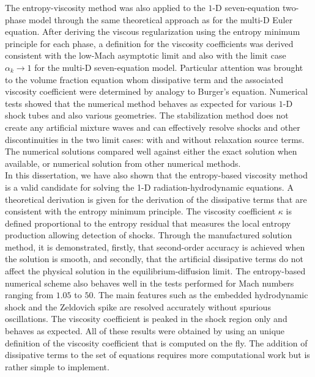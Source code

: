 The entropy-viscosity method was also applied to the $1$-D seven-equation two-phase model through the same theoretical approach as for the multi-D Euler equation. After deriving the viscous regularization using the entropy minimum principle for each phase, a definition for the viscosity coefficients was derived consistent with the low-Mach asymptotic limit and also with the limit case $\alpha_k \to 1$ for the multi-D seven-equation model. Particular attention was brought to the volume fraction equation whom dissipative term and the associated viscosity coefficient were determined by analogy to Burger's equation. 
Numerical tests showed that the numerical method behaves as expected for various $1$-D shock tubes and also various geometries. The stabilization method does not create any artificial mixture waves and can effectively resolve shocks and other discontinuities in the two limit cases: with and without relaxation source terms. The numerical solutions compared well against either the exact solution when available, or numerical solution from other numerical methods.\\

In this dissertation, we have also shown that the entropy-based viscosity method is a valid candidate for solving the 1-D radiation-hydrodynamic equations. A theoretical derivation is given for the derivation of the dissipative terms that are consistent with the entropy minimum principle. The viscosity coefficient $\kappa$ is defined proportional to the entropy residual that measures the local entropy production allowing detection of shocks. Through the manufactured solution method, it is demonstrated, firstly, that second-order accuracy is achieved when the solution is smooth, and secondly, that the artificial dissipative terms do not affect the physical solution in the equilibrium-diffusion limit. 
The entropy-based numerical scheme also behaves well in the tests performed for Mach numbers ranging from $1.05$ to $50$. The main features such as the embedded hydrodynamic shock and the Zeldovich spike are resolved accurately without spurious oscillations. The viscosity coefficient is peaked in the shock region only and behaves as expected. All of these results were obtained by using an unique definition of the viscosity coefficient that is computed on the fly. The addition of dissipative terms to the set of equations requires more computational work but is rather simple to implement.\\

